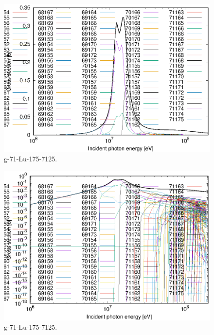\begin{figure}
 \includegraphics[width=\linewidth]{eps/g_71-Lu-175_7125.eps}
  \caption{g-71-Lu-175-7125.}
\end{figure}
\begin{figure}
 \includegraphics[width=\linewidth]{eps-log/g_71-Lu-175_7125.eps}
 \caption{g-71-Lu-175-7125.}
\end{figure}
\newpage \clearpage

